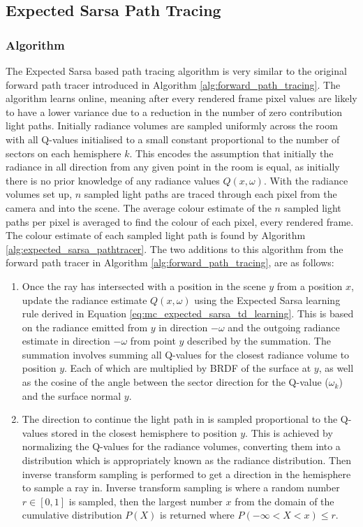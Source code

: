 \documentclass[../dissertation.tex]{subfiles}
\begin{document}
\subsection{Expected Sarsa Path Tracing}

\subsubsection{Algorithm}
The Expected Sarsa based path tracing algorithm is very similar to the original forward path tracer introduced in Algorithm \ref{alg:forward_path_tracing}. The algorithm learns online, meaning after every rendered frame pixel values are likely to have a lower variance due to a reduction in the number of zero contribution light paths. Initially radiance volumes are sampled uniformly across the room with all Q-values initialised to a small constant proportional to the number of sectors on each hemisphere $k$. This encodes the assumption that initially the radiance in all direction from any given point in the room is equal, as initially there is no prior knowledge of any radiance values $Q(x, \omega)$. With the radiance volumes set up, $n$ sampled light paths are traced through each pixel from the camera and into the scene. The average colour estimate of the $n$ sampled light paths per pixel is averaged to find the colour of each pixel, every rendered frame. The colour estimate of each sampled light path is found by Algorithm \ref{alg:expected_sarsa_pathtracer}. The two additions to this algorithm from the forward path tracer in Algorithm \ref{alg:forward_path_tracing}, are as follows:

\begin{enumerate}
\item Once the ray has intersected with a position in the scene $y$ from a position $x$, update the radiance estimate $Q(x, \omega)$ using the Expected Sarsa learning rule derived in Equation \ref{eq:mc_expected_sarsa_td_learning}. This is based on the radiance emitted from $y$ in direction $-\omega$ and the outgoing radiance estimate in direction $-\omega$ from point $y$ described by the summation. The summation involves summing all Q-values for the closest radiance volume to position $y$. Each of which are multiplied by BRDF of the surface at $y$, as well as the cosine of the angle between the sector direction for the Q-value ($\omega_k$) and the surface normal $y$.

\item The direction to continue the light path in is sampled proportional to the Q-values stored in the closest hemisphere to position $y$. This is achieved by normalizing the Q-values for the radiance volumes, converting them into a distribution which is appropriately known as the radiance distribution. Then inverse transform sampling \cite{devroye2006nonuniform} is performed to get a direction in the hemisphere to sample a ray in. Inverse transform sampling is where a random number $r \in [0,1]$ is sampled, then the largest number $x$ from the domain of the cumulative distribution $P(X)$ is returned where $ P(-\infty < X < x) \leq r$. 
\end{enumerate}
\end{document}
